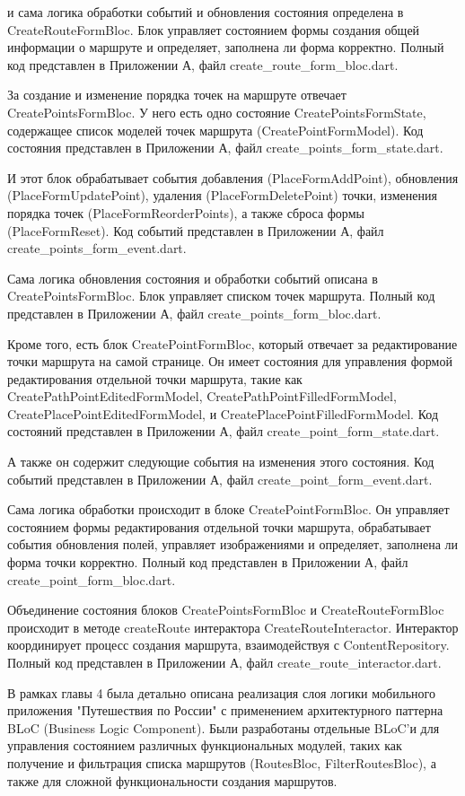 и сама логика обработки событий и обновления состояния определена в CreateRouteFormBloc. Блок управляет состоянием формы создания общей информации о маршруте и определяет, заполнена ли форма корректно. Полный код представлен в Приложении А, файл create\_route\_form\_bloc.dart.

За создание и изменение порядка точек на маршруте отвечает CreatePointsFormBloc. У него есть одно состояние CreatePointsFormState, содержащее список моделей точек маршрута (CreatePointFormModel). Код состояния представлен в Приложении А, файл create\_points\_form\_state.dart.

И этот блок обрабатывает события добавления (PlaceFormAddPoint), обновления (PlaceFormUpdatePoint), удаления (PlaceFormDeletePoint) точки, изменения порядка точек (PlaceFormReorderPoints), а также сброса формы (PlaceFormReset). Код событий представлен в Приложении А, файл create\_points\_form\_event.dart.

Сама логика обновления состояния и обработки событий описана в CreatePointsFormBloc. Блок управляет списком точек маршрута. Полный код представлен в Приложении А, файл create\_points\_form\_bloc.dart.

Кроме того, есть блок CreatePointFormBloc, который отвечает за редактирование точки маршрута на самой странице. Он имеет состояния для управления формой редактирования отдельной точки маршрута, такие как CreatePathPointEditedFormModel, CreatePathPointFilledFormModel, CreatePlacePointEditedFormModel, и CreatePlacePointFilledFormModel. Код состояний представлен в Приложении А, файл create\_point\_form\_state.dart.

А также он содержит следующие события на изменения этого состояния. Код событий представлен в Приложении А, файл create\_point\_form\_event.dart.

Сама логика обработки происходит в блоке CreatePointFormBloc. Он управляет состоянием формы редактирования отдельной точки маршрута, обрабатывает события обновления полей, управляет изображениями и определяет, заполнена ли форма точки корректно. Полный код представлен в Приложении А, файл create\_point\_form\_bloc.dart.

Объединение состояния блоков CreatePointsFormBloc и CreateRouteFormBloc  происходит в методе createRoute интерактора CreateRouteInteractor. Интерактор координирует процесс создания маршрута, взаимодействуя с ContentRepository. Полный код представлен в Приложении А, файл create\_route\_interactor.dart.

В рамках главы 4 была детально описана реализация слоя логики мобильного приложения "Путешествия по России" с применением архитектурного паттерна BLoC (Business Logic Component). Были разработаны отдельные BLoC'и для управления состоянием различных функциональных модулей, таких как получение и фильтрация списка маршрутов (RoutesBloc, FilterRoutesBloc), а также для сложной функциональности создания маршрутов.  

